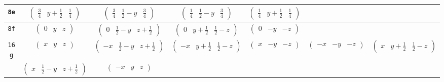 \documentclass[fleqn,9pt,landscape]{jsarticle}
\begin{document}
\begin{center}
\begin{longtable}{ccccccc}
{\tt 8e} & $ \begin{pmatrix} \frac{3}{4} & y + \frac{1}{2} & \frac{1}{4} \end{pmatrix} $ & $ \begin{pmatrix} \frac{3}{4} & \frac{1}{2} - y & \frac{3}{4} \end{pmatrix} $ & $ \begin{pmatrix} \frac{1}{4} & \frac{1}{2} - y & \frac{3}{4} \end{pmatrix} $ & $ \begin{pmatrix} \frac{1}{4} & y + \frac{1}{2} & \frac{1}{4} \end{pmatrix} $ & $  $ & $  $ \\ \hline
{\tt 8f} & $ \begin{pmatrix} 0 & y & z \end{pmatrix} $ & $ \begin{pmatrix} 0 & \frac{1}{2} - y & z + \frac{1}{2} \end{pmatrix} $ & $ \begin{pmatrix} 0 & y + \frac{1}{2} & \frac{1}{2} - z \end{pmatrix} $ & $ \begin{pmatrix} 0 & - y & - z \end{pmatrix} $ & $  $ & $  $ \\ \hline
{\tt 16g} & $ \begin{pmatrix} x & y & z \end{pmatrix} $ & $ \begin{pmatrix} - x & \frac{1}{2} - y & z + \frac{1}{2} \end{pmatrix} $ & $ \begin{pmatrix} - x & y + \frac{1}{2} & \frac{1}{2} - z \end{pmatrix} $ & $ \begin{pmatrix} x & - y & - z \end{pmatrix} $ & $ \begin{pmatrix} - x & - y & - z \end{pmatrix} $ & $ \begin{pmatrix} x & y + \frac{1}{2} & \frac{1}{2} - z \end{pmatrix} $ \\
& $ \begin{pmatrix} x & \frac{1}{2} - y & z + \frac{1}{2} \end{pmatrix} $ & $ \begin{pmatrix} - x & y & z \end{pmatrix} $ & $  $ & $  $ & $  $ & $  $ \\
\end{longtable}
\end{center}
\end{document}

